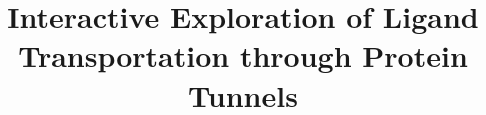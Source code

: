 \documentclass[twocolumn]{bmcart}%
\begin{document}
\begin{frontmatter}

\begin{fmbox}


\title{Interactive Exploration of Ligand Transportation through Protein Tunnels}

\author[
   addressref={aff1},
   email={furmanova@mail.muni.cz}
]{ }
\author[
   addressref={aff1},                   %
   email={jaresova@mail.muni.cz}   %
]{ }
\author[
   addressref={aff1,aff2},                   %
   email={xbyska@fi.muni.cz}   %
]{ }
\author[
   addressref={aff1},                   %
   email={xjurc@fi.muni.cz}   %
]{ }
\author[
   addressref={aff2},                   %
   email={julius.parulek@uib.no}   %
]{ }
\author[
   addressref={aff2},                   %
   email={Helwig.Hauser@uib.no}   %
]{ }
\author[
   addressref={aff1},                   %
   email={kozlikova@fi.muni.cz}   %
]{ }



\end{fmbox}
\end{frontmatter}
\end{document}
